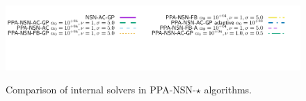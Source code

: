 \begin{figure}
 \\
{\includegraphics[height=\legendheight]{figure/PROX/NSN/InternalSolvers/1.0e-08/50/time/profile-Chain_legend.pdf}}
   \caption{Comparison of internal solvers in {\sf PPA-NSN-$\star$} algorithms.}
  \label{fig:PROX/NSN/InternalSolvers}
\end{figure}

